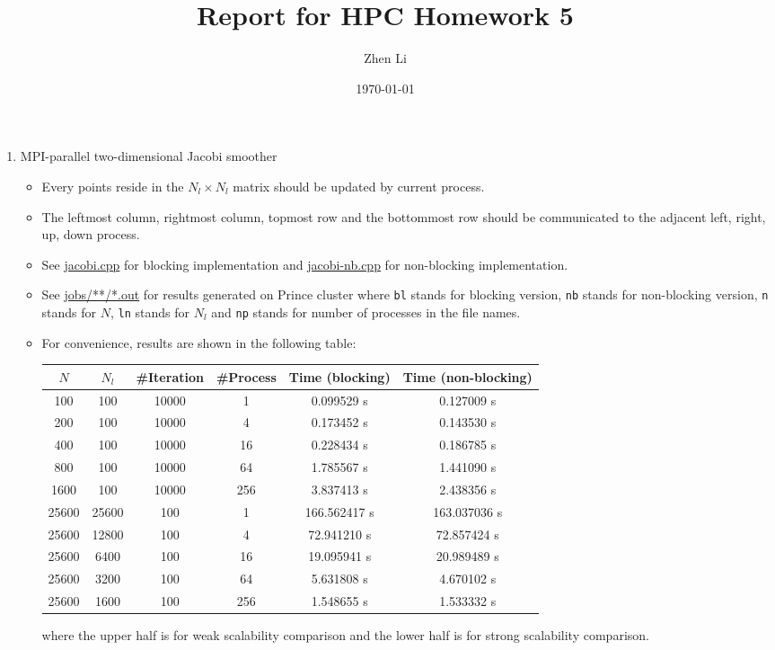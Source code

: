 \documentclass{article}
\title{Report for HPC Homework 5}
\author{Zhen Li}
\date{\today}
\begin{document}
\maketitle

\begin{enumerate}
  \item MPI-parallel two-dimensional Jacobi smoother
  \begin{itemize}
    \item Every points reside in the $N_l \times N_l$ matrix should be updated
    by current process.

    \item The leftmost column, rightmost column, topmost row and the
    bottommost row should be communicated to the adjacent left, right, up,
    down process.

    \item See \url{jacobi.cpp} for blocking implementation and
    \url{jacobi-nb.cpp} for non-blocking implementation.

    \item See \url{jobs/**/*.out} for results generated on Prince cluster
    where \lstinline{bl} stands for blocking version, \lstinline{nb} stands
    for non-blocking version, \lstinline{n} stands for $N$, \lstinline{ln}
    stands for $N_l$ and \lstinline{np} stands for number of processes in the
    file names.

    \item For convenience, results are shown in the following table:
    \begin{center}
      \begin{tabular}{cccccc}
        \toprule
        $N$ & $N_l$ & \#Iteration & \#Process & Time (blocking) &
          Time (non-blocking) \\
        \midrule
        100  & 100 & 10000 & 1   & 0.099529 s & 0.127009 s \\
        200  & 100 & 10000 & 4   & 0.173452 s & 0.143530 s \\
        400  & 100 & 10000 & 16  & 0.228434 s & 0.186785 s \\
        800  & 100 & 10000 & 64  & 1.785567 s & 1.441090 s \\
        1600 & 100 & 10000 & 256 & 3.837413 s & 2.438356 s \\
        \midrule
        25600 & 25600 & 100 & 1   & 166.562417 s & 163.037036 s \\
        25600 & 12800 & 100 & 4   & 72.941210  s & 72.857424  s \\
        25600 & 6400  & 100 & 16  & 19.095941  s & 20.989489  s \\
        25600 & 3200  & 100 & 64  & 5.631808   s & 4.670102   s \\
        25600 & 1600  & 100 & 256 & 1.548655   s & 1.533332   s \\
        \bottomrule
      \end{tabular}
    \end{center}
    where the upper half is for weak scalability comparison and the lower half
    is for strong scalability comparison.


\end{itemize}
\end{enumerate}
\end{document}
